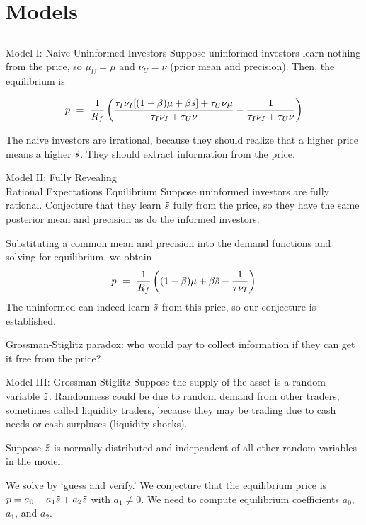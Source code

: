 \documentclass[xcolor=dvipsnames,10pt]{beamer}
\begin{document}
\section{Models}\subsection{}

\begin{frame}{Model I: Naive Uninformed Investors}
    Suppose uninformed investors learn nothing from the price, so $\mu_U=\mu$ and $\nu_U=\nu$ (prior mean and precision).  Then, the equilibrium is
    
    $$p \ = \ \frac{1}{R_f}\left(\frac{\tau_I\nu_I[(1-\beta)\mu + \beta\ts] + \tau_U\nu\mu}{\tau_I\nu_I+\tau_U\nu} - \frac{1}{\tau_I\nu_I+\tau_U\nu}\right)$$

 The naive investors are irrational, because they should realize that a higher price means a higher $\tilde{s}$.  They should extract information from the price.
 \end{frame}
 
 \begin{frame}{Model II: Fully Revealing \\Rational Expectations Equilibrium}
    Suppose uninformed investors are fully rational.  Conjecture that they learn $\tilde{s}$ fully from the price, so they have the same posterior mean and precision as do the informed investors.  
    
    Substituting a common mean and precision into the demand functions and solving for equilibrium, we obtain
        $$p \ = \ \frac{1}{R_f}\left((1-\beta)\mu + \beta\ts - \frac{1}{\tau\nu_I}\right)$$
The uninformed can indeed learn $\tilde{s}$ from this price, so our conjecture is established.

 Grossman-Stiglitz paradox:  who would pay to collect information if they can get it free from the price?
 \end{frame}
 
 \begin{frame}{Model III: Grossman-Stiglitz}
     Suppose the supply of the asset is a random variable $\tilde{z}$.  Randomness could be due to random demand from other traders, sometimes called liquidity traders, because they may be trading due to cash needs or cash surpluses (liquidity shocks).
     
    Suppose $\tilde{z}$ is normally distributed and independent of all other random variables in the model.  
    
    We solve by `guess and verify.'
 We conjecture that the equilibrium price is $p = a_0 + a_1 \tilde{s} + a_2 \tilde{z}$ with $a_1 \neq 0$.  We need to compute equilibrium coefficients $a_0$, $a_1$, and $a_2$.

\end{frame}
\end{document}
